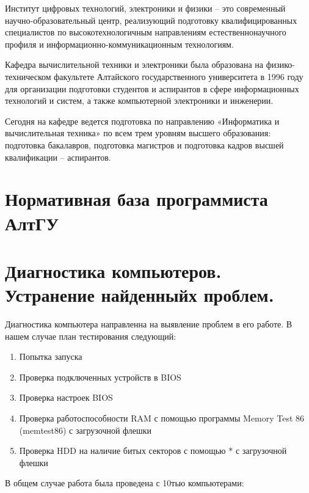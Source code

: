 \documentclass[a4paper, 12pt]{article}
\begin{document}
Институт цифровых технологий, электроники и физики – это современный научно-образовательный центр, реализующий подготовку квалифицированных специалистов по высокотехнологичным направлениям естественнонаучного профиля и информационно-коммуникационным технологиям.

Кафедра вычислительной техники и электроники была образована на физико-техническом факультете Алтайского государственного университета в 1996 году для организации подготовки студентов и аспирантов в сфере информационных технологий и систем, а также компьютерной электроники и инженерии.

Сегодня на кафедре ведется подготовка по направлению «Информатика и вычислительная техника» по всем трем уровням высшего образования: подготовка бакалавров, подготовка магистров и подготовка кадров высшей квалификации – аспирантов. 

\section{Нормативная база программиста АлтГУ}

\section{Диагностика компьютеров. Устранение найденныйх проблем.}
Диагностика компьютера направленна на выявление проблем в его работе. В нашем случае план тестирования следующий:
\begin{enumerate}
  \item Попытка запуска
  \item Проверка подключенных устройств в BIOS
  \item Проверка настроек BIOS
  \item Проверка работоспособности RAM с помощью программы Memory Test 86 (memtest86) с загрузочной флешки
  \item Проверка HDD на наличие битых секторов с помощью * с загрузочной флешки
\end{enumerate}

В общем случае работа была проведена с 10тью компьютерами:
\end{document}
